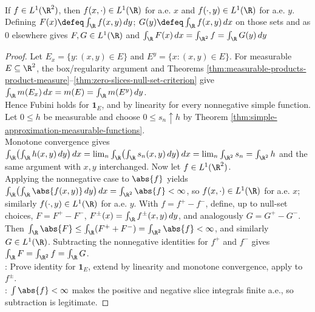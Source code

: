 \begin{theorem} \label{thm:fubini-absolutely-integrable-functions} \\
If $f\in L^1(\R^2)$, then $f(x,\cdot)\in L^1(\R)$ for a.e. $x$ and $f(\cdot,y)\in L^1(\R)$ for a.e. $y$. Defining $F(x)\defeq\int_{\R}f(x,y)\,dy$; $G(y)\defeq\int_{\R}f(x,y)\,dx$ on those sets and as $0$ elsewhere gives $F,G\in L^1(\R)$ and $\int_{\R}F(x)\,dx=\int_{\R^2}f=\int_{\R}G(y)\,dy$
\begin{proof}
Let $E_x=\{y:(x,y)\in E\}$ and $E^y=\{x:(x,y)\in E\}$. For measurable $E\subseteq\R^2$, the box/regularity argument and Theorems \ref{thm:measurable-products-product-measure}--\ref{thm:zero-slices-null-set-criterion} give $\int_{\R}m(E_x)\,dx=m(E)=\int_{\R}m(E^y)\,dy$.\\
Hence Fubini holds for $\mathbf{1}_E$, and by linearity for every nonnegative simple function.\\
Let $0\leq h$ be measurable and choose $0\leq s_n\uparrow h$ by Theorem \ref{thm:simple-approximation-measurable-functions}.\\
Monotone convergence gives $\int_{\R}\!\left(\int_{\R}h(x,y)\,dy\right)dx =\lim_n\int_{\R}\!\left(\int_{\R}s_n(x,y)\,dy\right)dx =\lim_n\int_{\R^2}s_n =\int_{\R^2}h$ and the same argument with $x,y$ interchanged. Now let $f\in L^1(\R^2)$.\\
Applying the nonnegative case to $\abs{f}$ yields $\int_{\R}\!\left(\int_{\R}\abs{f(x,y)}\,dy\right)dx =\int_{\R^2}\abs{f}<\infty$, so $f(x,\cdot)\in L^1(\R)$ for a.e. $x$; similarly $f(\cdot,y)\in L^1(\R)$ for a.e. $y$. With $f=f^+-f^-$, define, up to null-set choices, $F=F^+-F^-$, $F^\pm(x)=\int_{\R}f^\pm(x,y)\,dy$, and analogously $G=G^+-G^-$. Then $\int_{\R}\abs{F}\leq\int_{\R}(F^++F^-)=\int_{\R^2}\abs{f}<\infty$, and similarly $G\in L^1(\R)$. Subtracting the nonnegative identities for $f^+$ and $f^-$ gives $\int_{\R}F=\int_{\R^2}f=\int_{\R}G$.\\
: Prove identity for $\mathbf{1}_E$, extend by linearity and monotone convergence, apply to $f^\pm$.\\
: $\int\abs{f}<\infty$ makes the positive and negative slice integrals finite a.e., so subtraction is legitimate.
\end{proof}
\end{theorem}
